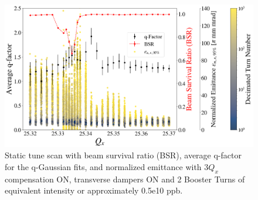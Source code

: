 \begin{figure}[H]
    \centering
    \includegraphics[width=\columnwidth]{chapter6/static2turns_emittance_dampersON.png}
    \caption{Static tune scan with beam survival ratio (BSR), average q-factor for the q-Gaussian fits, and normalized emittance with $3Q_x$ compensation ON, transverse dampers ON and 2 Booster Turns of equivalent intensity or approximately 0.5e10 ppb.}
    \label{fig:static2_scatter_dampersON}
   \vspace{-1.25em}
\end{figure}